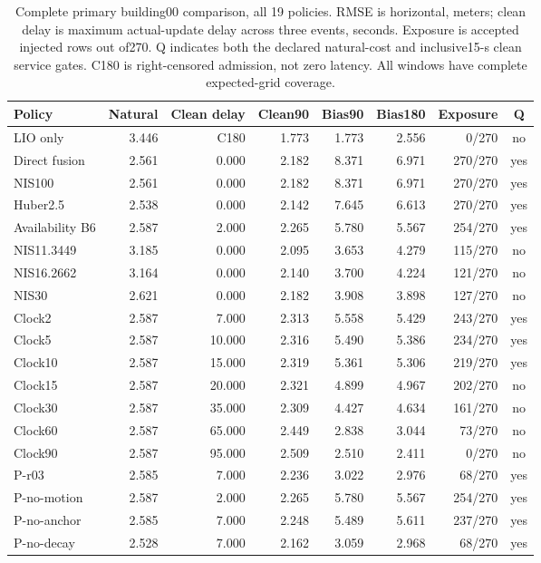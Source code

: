 \begin{table}[t]\centering\small
\caption{Complete primary building00 comparison, all 19 policies. RMSE is horizontal, meters; clean delay is maximum actual-update delay across three events, seconds. Exposure is accepted injected rows out of270. Q indicates both the declared natural-cost and inclusive15-s clean service gates. C180 is right-censored admission, not zero latency. All windows have complete expected-grid coverage.}\label{tab:primary}
\begin{tabular}{lrrrrrrc}\toprule
Policy & Natural & Clean delay & Clean90 & Bias90 & Bias180 & Exposure & Q\\\midrule
LIO only & 3.446 & C180 & 1.773 & 1.773 & 2.556 & 0/270 & no \\
Direct fusion & 2.561 & 0.000 & 2.182 & 8.371 & 6.971 & 270/270 & yes \\
NIS100 & 2.561 & 0.000 & 2.182 & 8.371 & 6.971 & 270/270 & yes \\
Huber2.5 & 2.538 & 0.000 & 2.142 & 7.645 & 6.613 & 270/270 & yes \\
Availability B6 & 2.587 & 2.000 & 2.265 & 5.780 & 5.567 & 254/270 & yes \\
NIS11.3449 & 3.185 & 0.000 & 2.095 & 3.653 & 4.279 & 115/270 & no \\
NIS16.2662 & 3.164 & 0.000 & 2.140 & 3.700 & 4.224 & 121/270 & no \\
NIS30 & 2.621 & 0.000 & 2.182 & 3.908 & 3.898 & 127/270 & no \\
Clock2 & 2.587 & 7.000 & 2.313 & 5.558 & 5.429 & 243/270 & yes \\
Clock5 & 2.587 & 10.000 & 2.316 & 5.490 & 5.386 & 234/270 & yes \\
Clock10 & 2.587 & 15.000 & 2.319 & 5.361 & 5.306 & 219/270 & yes \\
Clock15 & 2.587 & 20.000 & 2.321 & 4.899 & 4.967 & 202/270 & no \\
Clock30 & 2.587 & 35.000 & 2.309 & 4.427 & 4.634 & 161/270 & no \\
Clock60 & 2.587 & 65.000 & 2.449 & 2.838 & 3.044 & 73/270 & no \\
Clock90 & 2.587 & 95.000 & 2.509 & 2.510 & 2.411 & 0/270 & no \\
P-r03 & 2.585 & 7.000 & 2.236 & 3.022 & 2.976 & 68/270 & yes \\
P-no-motion & 2.587 & 2.000 & 2.265 & 5.780 & 5.567 & 254/270 & yes \\
P-no-anchor & 2.585 & 7.000 & 2.248 & 5.489 & 5.611 & 237/270 & yes \\
P-no-decay & 2.528 & 7.000 & 2.162 & 3.059 & 2.968 & 68/270 & yes \\
\bottomrule\end{tabular}\end{table}
